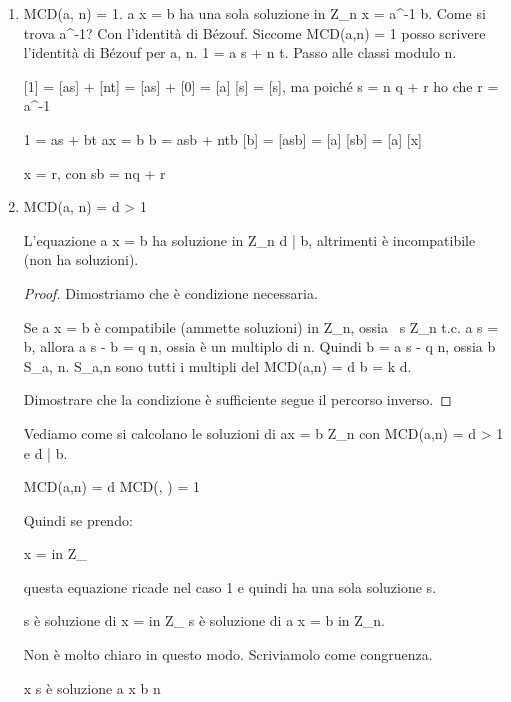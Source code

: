 \begin{enumerate}
    \item MCD(a, n) = 1. a x = b ha una sola soluzione in Z_n x = a^{-1} \cdot b. Come si trova a^{-1}? Con l'identit\`a di B\'ezouf. Siccome MCD(a,n) = 1 \Rightarrow posso scrivere l'identit\`a di B\'ezouf per a, n. 1 = a \cdot s + n \cdot t. Passo alle classi modulo n.

    [1] = [as] + [nt] = [as] + [0] = [a] [s] \Rightarrow [a^{-1}] = [s], ma poich\'e s = n q + r ho che r = a^{-1}

    1 = as + bt
    ax = b
    b = asb + ntb
    [b] = [asb] = [a] [sb] = [a] [x]

    x = r, con sb = nq + r

    \item MCD(a, n) = d > 1

    \begin{prop}
    L'equazione a x = b ha soluzione in Z_n \Leftrightarrow d | b, altrimenti \`e incompatibile (non ha soluzioni).
    \end{prop}
    \begin{proof}
    Dimostriamo che \`e condizione necessaria.

    Se a x = b \`e compatibile (ammette soluzioni) in Z_n, ossia \exists \ s \in Z_n t.c. a \cdot s = b, allora a s - b = q n, ossia \`e un multiplo di n. Quindi b = a \cdot s - q \cdot n, ossia b \in S_{a, n}. S_{a,n} sono tutti i multipli del MCD(a,n) = d \Rightarrow b = k \cdot d.

    Dimostrare che la condizione \`e sufficiente segue il percorso inverso.
    \end{proof}
    Vediamo come si calcolano le soluzioni di ax = b \in Z_n con MCD(a,n) = d > 1 e d | b.
    \begin{oss}
    MCD(a,n) = d \Leftrightarrow MCD(, ) = 1
    \end{oss}
    Quindi se prendo:

     x =  in Z_{} 

    questa equazione ricade nel caso 1 e quindi ha una sola soluzione s.

    s \`e soluzione di  x =  in Z_{} \Leftrightarrow s \`e soluzione di a \cdot x = b in Z_n.

    Non \`e molto chiaro in questo modo. Scriviamolo come congruenza.

     x \equiv {} \pmod {} \Leftrightarrow s \`e soluzione a \cdot x \equiv b \pmod n


\end{enumerate}
